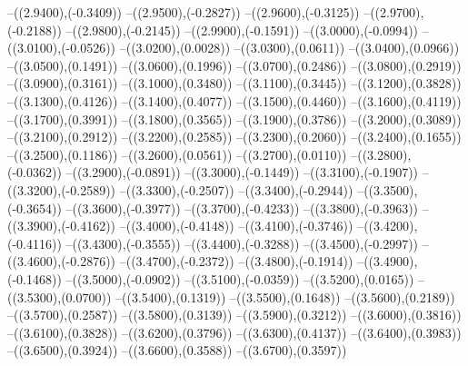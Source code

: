 {	--({\sx*(2.9400)},{\sy*(-0.3409)})
	--({\sx*(2.9500)},{\sy*(-0.2827)})
	--({\sx*(2.9600)},{\sy*(-0.3125)})
	--({\sx*(2.9700)},{\sy*(-0.2188)})
	--({\sx*(2.9800)},{\sy*(-0.2145)})
	--({\sx*(2.9900)},{\sy*(-0.1591)})
	--({\sx*(3.0000)},{\sy*(-0.0994)})
	--({\sx*(3.0100)},{\sy*(-0.0526)})
	--({\sx*(3.0200)},{\sy*(0.0028)})
	--({\sx*(3.0300)},{\sy*(0.0611)})
	--({\sx*(3.0400)},{\sy*(0.0966)})
	--({\sx*(3.0500)},{\sy*(0.1491)})
	--({\sx*(3.0600)},{\sy*(0.1996)})
	--({\sx*(3.0700)},{\sy*(0.2486)})
	--({\sx*(3.0800)},{\sy*(0.2919)})
	--({\sx*(3.0900)},{\sy*(0.3161)})
	--({\sx*(3.1000)},{\sy*(0.3480)})
	--({\sx*(3.1100)},{\sy*(0.3445)})
	--({\sx*(3.1200)},{\sy*(0.3828)})
	--({\sx*(3.1300)},{\sy*(0.4126)})
	--({\sx*(3.1400)},{\sy*(0.4077)})
	--({\sx*(3.1500)},{\sy*(0.4460)})
	--({\sx*(3.1600)},{\sy*(0.4119)})
	--({\sx*(3.1700)},{\sy*(0.3991)})
	--({\sx*(3.1800)},{\sy*(0.3565)})
	--({\sx*(3.1900)},{\sy*(0.3786)})
	--({\sx*(3.2000)},{\sy*(0.3089)})
	--({\sx*(3.2100)},{\sy*(0.2912)})
	--({\sx*(3.2200)},{\sy*(0.2585)})
	--({\sx*(3.2300)},{\sy*(0.2060)})
	--({\sx*(3.2400)},{\sy*(0.1655)})
	--({\sx*(3.2500)},{\sy*(0.1186)})
	--({\sx*(3.2600)},{\sy*(0.0561)})
	--({\sx*(3.2700)},{\sy*(0.0110)})
	--({\sx*(3.2800)},{\sy*(-0.0362)})
	--({\sx*(3.2900)},{\sy*(-0.0891)})
	--({\sx*(3.3000)},{\sy*(-0.1449)})
	--({\sx*(3.3100)},{\sy*(-0.1907)})
	--({\sx*(3.3200)},{\sy*(-0.2589)})
	--({\sx*(3.3300)},{\sy*(-0.2507)})
	--({\sx*(3.3400)},{\sy*(-0.2944)})
	--({\sx*(3.3500)},{\sy*(-0.3654)})
	--({\sx*(3.3600)},{\sy*(-0.3977)})
	--({\sx*(3.3700)},{\sy*(-0.4233)})
	--({\sx*(3.3800)},{\sy*(-0.3963)})
	--({\sx*(3.3900)},{\sy*(-0.4162)})
	--({\sx*(3.4000)},{\sy*(-0.4148)})
	--({\sx*(3.4100)},{\sy*(-0.3746)})
	--({\sx*(3.4200)},{\sy*(-0.4116)})
	--({\sx*(3.4300)},{\sy*(-0.3555)})
	--({\sx*(3.4400)},{\sy*(-0.3288)})
	--({\sx*(3.4500)},{\sy*(-0.2997)})
	--({\sx*(3.4600)},{\sy*(-0.2876)})
	--({\sx*(3.4700)},{\sy*(-0.2372)})
	--({\sx*(3.4800)},{\sy*(-0.1914)})
	--({\sx*(3.4900)},{\sy*(-0.1468)})
	--({\sx*(3.5000)},{\sy*(-0.0902)})
	--({\sx*(3.5100)},{\sy*(-0.0359)})
	--({\sx*(3.5200)},{\sy*(0.0165)})
	--({\sx*(3.5300)},{\sy*(0.0700)})
	--({\sx*(3.5400)},{\sy*(0.1319)})
	--({\sx*(3.5500)},{\sy*(0.1648)})
	--({\sx*(3.5600)},{\sy*(0.2189)})
	--({\sx*(3.5700)},{\sy*(0.2587)})
	--({\sx*(3.5800)},{\sy*(0.3139)})
	--({\sx*(3.5900)},{\sy*(0.3212)})
	--({\sx*(3.6000)},{\sy*(0.3816)})
	--({\sx*(3.6100)},{\sy*(0.3828)})
	--({\sx*(3.6200)},{\sy*(0.3796)})
	--({\sx*(3.6300)},{\sy*(0.4137)})
	--({\sx*(3.6400)},{\sy*(0.3983)})
	--({\sx*(3.6500)},{\sy*(0.3924)})
	--({\sx*(3.6600)},{\sy*(0.3588)})
	--({\sx*(3.6700)},{\sy*(0.3597)})
}
